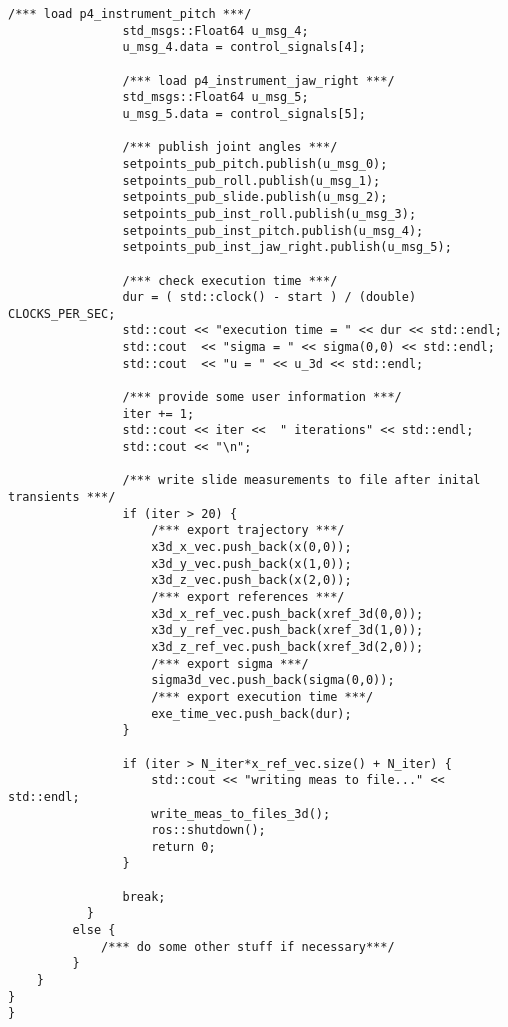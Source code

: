 \begin{lstlisting}[language=gedit]
                /*** load p4_instrument_pitch ***/
                std_msgs::Float64 u_msg_4;
                u_msg_4.data = control_signals[4];

                /*** load p4_instrument_jaw_right ***/
                std_msgs::Float64 u_msg_5;
                u_msg_5.data = control_signals[5];

                /*** publish joint angles ***/
                setpoints_pub_pitch.publish(u_msg_0);
                setpoints_pub_roll.publish(u_msg_1);
                setpoints_pub_slide.publish(u_msg_2);
                setpoints_pub_inst_roll.publish(u_msg_3);
                setpoints_pub_inst_pitch.publish(u_msg_4);
                setpoints_pub_inst_jaw_right.publish(u_msg_5);

                /*** check execution time ***/
                dur = ( std::clock() - start ) / (double) CLOCKS_PER_SEC;
                std::cout << "execution time = " << dur << std::endl; 
                std::cout  << "sigma = " << sigma(0,0) << std::endl;
                std::cout  << "u = " << u_3d << std::endl;

                /*** provide some user information ***/
                iter += 1;
                std::cout << iter <<  " iterations" << std::endl;
                std::cout << "\n";

                /*** write slide measurements to file after inital transients ***/
                if (iter > 20) {
                    /*** export trajectory ***/
                    x3d_x_vec.push_back(x(0,0));
                    x3d_y_vec.push_back(x(1,0));
                    x3d_z_vec.push_back(x(2,0));
                    /*** export references ***/
                    x3d_x_ref_vec.push_back(xref_3d(0,0));
                    x3d_y_ref_vec.push_back(xref_3d(1,0));
                    x3d_z_ref_vec.push_back(xref_3d(2,0));
                    /*** export sigma ***/
                    sigma3d_vec.push_back(sigma(0,0));
                    /*** export execution time ***/
                    exe_time_vec.push_back(dur);
                }
            
                if (iter > N_iter*x_ref_vec.size() + N_iter) {
                    std::cout << "writing meas to file..." << std::endl;
                    write_meas_to_files_3d();
                    ros::shutdown();
                    return 0;
                }

                break;
           }
         else {
             /*** do some other stuff if necessary***/
         }
    }
}
}


\end{lstlisting}
